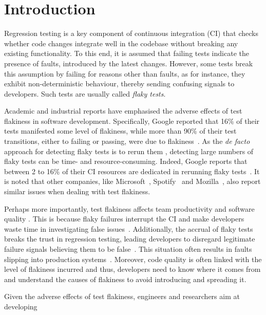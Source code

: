 \section{Introduction}
\label{sec:sherloc-introduction}

Regression testing is a key component of continuous integration (CI) that checks whether code changes integrate well in the codebase without breaking any existing functionality. To this end, it is assumed that failing tests indicate the presence of faults, introduced by the latest changes. However, some tests break this assumption by failing for reasons other than faults, as for instance,  they exhibit non-deterministic behaviour, thereby sending confusing signals to developers. Such tests are usually called \textit{flaky tests}.

Academic and industrial reports have emphasised the adverse effects of test flakiness in software development. Specifically, Google reported that 16\% of their tests manifested some level of flakiness, while more than 90\% of their test transitions, either to failing or passing, were due to flakiness~\cite{LeongSPTM19}. 
As the \textit{de facto} approach for detecting flaky tests is to rerun them \cite{Habchi2022Qualitative, gruber2022survey}, detecting large numbers of flaky tests can be time- and resource-consuming. Indeed, Google reports that between 2 to 16\% of their CI resources are dedicated in rerunning flaky tests~\cite{Micco2017}. It is noted  that other companies, like Microsoft~\cite{Lam2020b},  Spotify~\cite{FlakinessSpotify} and Mozilla~\cite{Rahman2018}, also report similar issues when dealing with test flakiness. 

Perhaps more importantly, test flakiness affects team productivity and software quality \cite{Habchi2022Qualitative}. This is because flaky failures interrupt the CI and make developers waste time in investigating false issues~\cite{GTAC2016,Eck2019,LeongSPTM19,Habchi2022Qualitative}. Additionally, the accrual of flaky tests breaks the trust in regression testing, leading developers to disregard legitimate failure signals believing them to be false~\cite{Habchi2022Qualitative, gruber2022survey}. This situation often results in faults slipping into production systems~\cite{Rahman2018}. Moreover, code quality is often linked with the level of flakiness incurred \cite{Habchi2022Qualitative} and thus, developers need to know where it comes from and understand the causes of flakiness to avoid introducing and spreading it. 

Given the adverse effects of test flakiness, engineers and researchers aim at developing 

